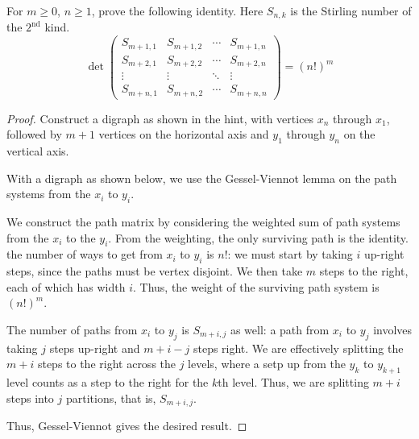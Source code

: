 \documentclass[letterpaper]{article}
\begin{document}
\begin{quest}[\textcolor{red}{Determinant of a matrix of Stirling Numbers}]
    For $m\geq0$, $n\geq 1$, prove the following identity. Here $S_{n,k}$ is the Stirling number of the $2^{\text{nd}}$ kind.
    \[\det\begin{pmatrix}S_{m+1,1}&S_{m+1,2}&\cdots&S_{m+1,n}\\S_{m+2,1}&S_{m+2,2}&\cdots&S_{m+2,n}\\\vdots&\vdots&\ddots&\vdots\\S_{m+n,1}&S_{m+n,2}&\cdots&S_{m+n,n}\end{pmatrix}=(n!)^m\]
\end{quest}
\begin{proof}
    Construct a digraph as shown in the hint, with vertices $x_n$ through $x_1$, followed by $m+1$ vertices on the horizontal axis and $y_1$ through $y_n$ on the vertical axis.

    With a digraph as shown below, we use the Gessel-Viennot lemma on the path systems from the $x_i$ to $y_i$.

    We construct the path matrix by considering the weighted sum of path systems from the $x_i$ to the $y_i$. From the weighting, the only surviving path is the identity. the number of ways to get from $x_i$ to $y_i$ is $n!$: we must start by taking $i$ up-right steps, since the paths must be vertex disjoint. We then take $m$ steps to the right, each of which has width $i$. Thus, the weight of the surviving path system is $(n!)^m$.

    The number of paths from $x_i$ to $y_j$ is $S_{m+i,j}$ as well: a path from $x_i$ to $y_j$ involves taking $j$ steps up-right and $m+i-j$ steps right. We are effectively splitting the $m+i$ steps to the right across the $j$ levels, where a setp up from the $y_k$ to $y_{k+1}$ level counts as a step to the right for the $k$th level. Thus, we are splitting $m+i$ steps into $j$ partitions, that is, $S_{m+i,j}$.

    Thus, Gessel-Viennot gives the desired result.
\end{proof}
\end{document}
